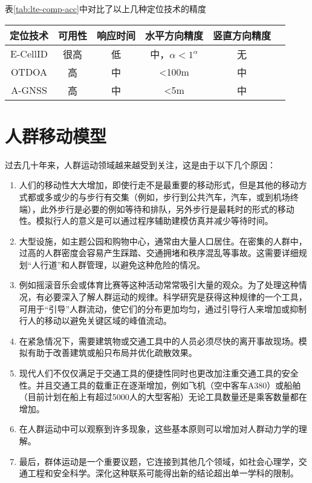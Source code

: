表\ref{tab:lte-comp-acc}中对比了以上几种定位技术的精度
\begin{table}[!hpb]
    \centering
    \begin{tabular}{@{}cccccc@{}} \toprule
        定位技术 & 可用性 & 响应时间 & 水平方向精度 & 竖直方向精度 \\ \midrule
        E-CellID & 很高 & 低 & 中，$\alpha<1^{\alpha}$ & 无 \\
        OTDOA & 高 & 中 & <100m & 中 \\
        A-GNSS & 高 & 中 & <5m & 中 \\ \bottomrule
    \end{tabular}
\end{table}

\section{人群移动模型}

过去几十年来，人群运动领域越来越受到关注，这是由于以下几个原因：
\begin{enumerate}
    \item 人们的移动性大大增加，即使行走不是最重要的移动形式，但是其他的移动方式都或多或少的与步行有交集（例如，步行到公共汽车，汽车，或到机场终端），此外步行是必要的例如等待和排队，另外步行是最耗时的形式的移动性。模拟行人的意义是可以通过程序辅助建模仿真并减少等待时间。
    \item 大型设施，如主题公园和购物中心，通常由大量人口居住。在密集的人群中，过高的人群密度会容易产生踩踏、交通拥堵和秩序混乱等事故。这需要详细规划“人行道”和人群管理，以避免这种危险的情况。
    \item 例如摇滚音乐会或体育比赛等这种活动常常吸引大量的观众。为了处理这种情况，有必要深入了解人群运动的规律。科学研究是获得这种规律的一个工具，可用于“引导”人群流动，使它们的分布更加均匀，通过引导行人来增加或抑制行人的移动以避免关键区域的峰值流动。
    \item 在紧急情况下，需要建筑物或交通工具中的人员必须尽快的离开事故现场。模拟有助于改善建筑或船只布局并优化疏散效果。
    \item 现代人们不仅仅满足于交通工具的便捷性同时也更改加注重交通工具的安全性。并且交通工具的载重正在逐渐增加，例如飞机（空中客车A380）或船舶（目前计划在船上有超过5000人的大型客船）无论工具数量还是乘客数量都在增加。
    \item 在人群运动中可以观察到许多现象，这些基本原则可以增加对人群动力学的理解。
    \item 最后，群体运动是一个重要议题，它连接到其他几个领域，如社会心理学，交通工程和安全科学。深化这种联系可能得出新的结论超出单一学科的限制。
\end{enumerate}

